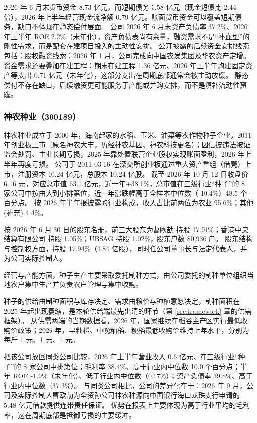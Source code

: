  2026 年 6 月末货币资金 8.73 亿元，而短期债务 3.58 亿元（现金短债比 2.44 倍），2026 年上半年经营现金流净额 0.79 亿元。账面货币资金可以覆盖短期债务，缺口不体现在静态偿付层面。 公司 2026 年 6 月末资产负债率 37.2\%、2026 年上半年 ROE 2.2\%（未年化），资产负债表尚有余量，融资需求不是“补血型”的刚性需求，而是配套在建项目投入的主动性安排。 公开披露的后续资金安排线索包括：股权融资线索：2026 年 1 月，公司完成向中国农发集团及华农资产定增。 资金需求还要叠加在建工程：期末在建工程 1.36 亿元、2026 年上半年购建固定资产等支出 0.71 亿元（未年化），这部分支出在周期底部通常会被主动放缓。 静态偿付不存在缺口，后续融资更可能服务于产能或并购安排，而不是填补流动性窟窿。




\subsubsection{神农种业（300189）}
\label{co:300189}

 神农种业成立于 2000 年，海南起家的水稻、玉米、油菜等农作物种子企业，2011 年创业板上市（原名神农大丰，历经神农基因、神农科技更名）；因信披违法被证监会处罚、主业长期亏损，2025 年靠处置联营企业股权实现账面盈利，2026 年上半年再度亏损。 公司于 2011-03-16 在深交所创业板通过重大资产重组（借壳）上市，注册资本 10.24 亿元，总股本 10.24 亿股。 截至 2026 年 10 月 12 日收盘价 6.16 元，对应总市值 63.1 亿元，近一年+38.1\%，总市值在三级行业“种子”的 8 家公司中按由大到小排第位，近一年涨跌幅高于全样本中位数（-10.4\%）48.5 个百分点。 按 2026 年半年报披露的行业构成，收入占比前两位为农业 95.6\%；其他(补充) 4.4\%。

 按 2026 年 6 月 30 日的股东名册，前三大股东为曹欧劼 持股 17.94\%；香港中央结算有限公司 持股 1.05\%；UBSAG 持股 1.02\%，股东户数 80,936 户。 股东结构与控制权方面，持股 17.94\%（1.84 亿股），同时任公司董事长与法定代表人，并为公司实际控制人。

 经营与产能方面，种子生产主要采取委托制种方式，由公司委托的制种单位组织当地农户集中生产并负责农户管理与集中收购。

 种子的供给由制种面积与库存决定、需求由粮价与种植意愿决定，制种面积在 2025 年起出现萎缩，是本轮供给端最先出清的环节（第 \ref{sec:framework} 章的供需框架）。 从供需两端的当期数据看，2026 年，国家继续在稻谷主产区实行最低收购价政策；2026 年，早籼稻、中晚籼稻、粳稻最低收购价维持上年水平，分别为每斤 1 元、1 元、1 元。

 把该公司放回同类公司比较，2026 年上半年营业收入 0.6 亿元、在三级行业“种子”的 8 家公司中排第位；毛利率 38.4\%、高于行业内中位数 10.0 个百分点；半年 ROE -1.9\%（未年化）、低于行业内中位数（0.17\%）；资产负债率 39.8\%、高于行业内中位数（37.3\%）。 与同类公司相比，公司的差异化在于：2026 年 9 月，公司及实际控制人曹欧劼为全资孙公司神农种源向中国银行海口龙珠支行申请的 5.48 亿元借款提供连带责任保证。 优势在报表上主要体现为高于行业平均的毛利率，这在周期底部是抵御亏损的主要缓冲。

